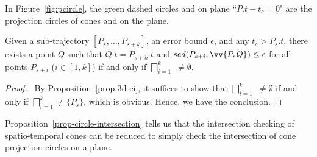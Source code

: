 \vspace{.5ex}


In Figure~\ref{fig:pcircle}, the green dashed circles  and  on plane ``$P.t-t_{c}=0$" are the projection circles of cones  and  on the plane.




\begin{prop}
\label{prop-circle-intersection}
Given a sub-trajectory $[P_s,\ldots, P_{s+k}]$, an error bound $\epsilon$, and any $t_c > P_s.t$, there exists a point $Q$ such that $Q.t = P_{s+k}.t$ and $sed(P_{s+i}, \vv{P_sQ})\le \epsilon$ for all points $P_{s+i}$ ($i \in [1,k]$) if and only if $\bigsqcap_{i=1}^{k}$ $\ne \emptyset$.
\end{prop}


\begin{proof}\
By Proposition~\ref{prop-3d-ci}, it suffices to show that $\bigsqcap_{i=1}^{k}$  $\ne \emptyset$ if and only if $\bigsqcap_{i=1}^{k}$$\ne \{P_s\}$, which is obvious. Hence, we have the conclusion. \eop
\end{proof}



Proposition~\ref{prop-circle-intersection} tells us that the intersection checking of spatio-temporal cones can be reduced to simply check the intersection of cone projection circles on a plane. %

